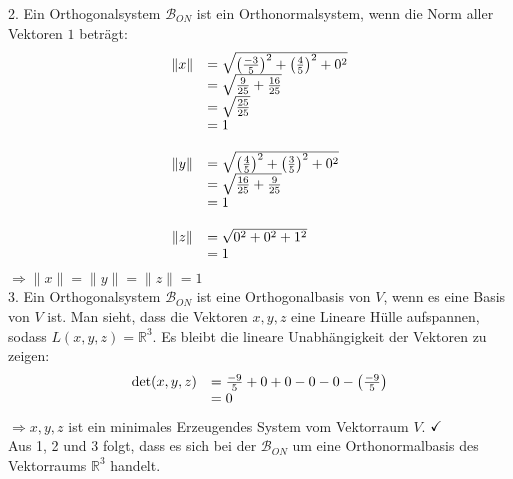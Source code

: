 \documentclass[main.tex]{subfiles}
\begin{document}
2. Ein Orthogonalsystem $\mathcal{B}_{ON}$ ist ein Orthonormalsystem, wenn die Norm aller Vektoren $1$ beträgt:
\begin{equation*}
    \begin{array}{ c l }
        \| x\|  & =\sqrt{\left(\frac{-3}{5}\right)^{2} +\left(\frac{4}{5}\right)^{2} +0^{2}}\\
        & =\sqrt{\frac{9}{25} +\frac{16}{25}}\\
        & =\sqrt{\frac{25}{25}}\\
        & =1\\
        & \\
        \| y\|  & =\sqrt{\left(\frac{4}{5}\right)^{2} +\left(\frac{3}{5}\right)^{2} +0^{2}}\\
        & =\sqrt{\frac{16}{25} +\frac{9}{25}}\\
        & =1\\
        & \\
        \| z\|  & =\sqrt{0^{2} +0^{2} +1^{2}}\\
        & =1
    \end{array}
\end{equation*}
$\Rightarrow \| x\| =\| y\| =\| z\| =1$\\


3. Ein Orthogonalsystem $\mathcal{B}_{ON}$ ist eine Orthogonalbasis von $V$, wenn es eine Basis von $V$ ist. 
Man sieht, dass die Vektoren $x,y,z$ eine Lineare Hülle aufspannen, sodass $L( x,y,z) =\mathbb{R}^{3}$. Es bleibt die lineare Unabhängigkeit der Vektoren zu zeigen:
\begin{equation*}
    \begin{array}{ c l }
        \det( x,y,z) & =\frac{-9}{5} +0+0-0-0-\left(\frac{-9}{5}\right)\\
        & =0
    \end{array}
\end{equation*}
$\Rightarrow $$x,y,z$ ist ein minimales Erzeugendes System vom Vektorraum $V$. $\checkmark $\\

Aus 1, 2 und 3 folgt, dass es sich bei der $\mathcal{B}_{ON}$ um eine Orthonormalbasis des Vektorraums $\mathbb{R}^{3}$ handelt.
\end{document}
